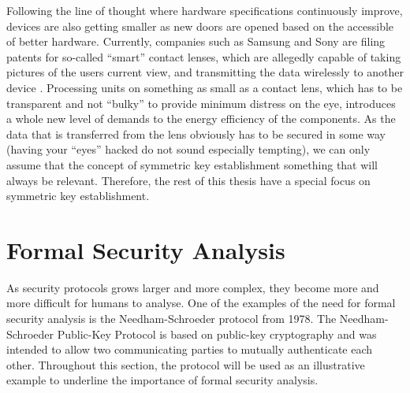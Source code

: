


Following the line of thought where hardware specifications continuously improve, devices are also getting smaller as new doors are opened based on the accessible of better hardware. Currently, companies such as Samsung and Sony are filing patents for so-called ``smart'' contact lenses, which are allegedly capable of taking pictures of the users current view, and transmitting the data wirelessly to another device \cite{sony-lens, samsung-lens}. Processing units on something as small as a contact lens, which has to be transparent and not ``bulky'' to provide minimum distress on the eye, introduces a whole new level of demands to the energy efficiency of the components. As the data that is transferred from the lens obviously has to be secured in some way (having your ``eyes'' hacked do not sound especially tempting), we can only assume that the concept of symmetric key establishment something that will always be relevant. Therefore, the rest of this thesis have a special focus on symmetric key establishment.



\section{Formal Security Analysis} 
\label{sec:formal}

As security protocols grows larger and more complex, they become more and more difficult for humans to analyse. One of the examples of the need for formal security analysis is the Needham-Schroeder protocol \cite{Needham:1978} from 1978. The Needham-Schroeder Public-Key Protocol is based on public-key cryptography and was intended to allow two communicating parties to mutually authenticate each other. Throughout this section, the protocol will be used as an illustrative example to underline the importance of formal security analysis.

